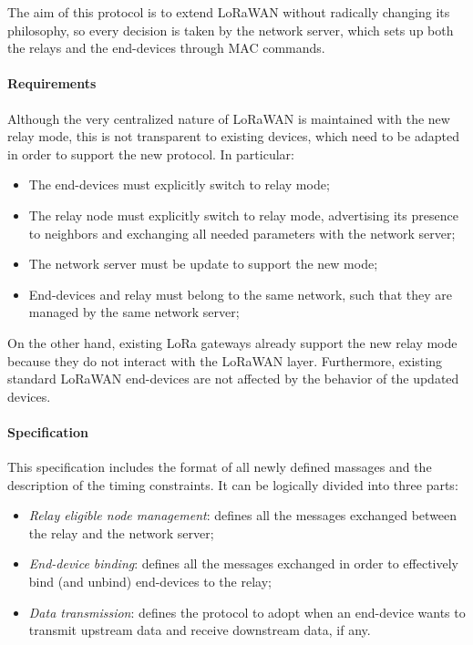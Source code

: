 The aim of this protocol is to extend LoRaWAN without radically changing its philosophy, so every decision is taken by the network server, which sets up both the relays and the end-devices through MAC commands.

\paragraph{Requirements} Although the very centralized nature of LoRaWAN is maintained with the new relay mode, this is not transparent to existing devices, which need to be adapted in order to support the new protocol. In particular:

\begin{itemize}
\item The end-devices must explicitly switch to relay mode;
\item The relay node must explicitly switch to relay mode, advertising its presence to neighbors and exchanging all needed parameters with the network server;
\item The network server must be update to support the new mode;
\item End-devices and relay must belong to the same network, such that they are managed by the same network server;
\end{itemize}

On the other hand, existing LoRa gateways already support the new relay mode because they do not interact with the LoRaWAN layer. Furthermore, existing standard LoRaWAN end-devices are not affected by the behavior of the updated devices. 



\paragraph{Specification} This specification includes the format of all newly defined massages and the description of the timing constraints. It can be logically divided into three parts:

\begin{itemize}
\item \emph{Relay eligible node management}: defines all the messages exchanged between the relay and the network server;

\item \emph{End-device binding}: defines all the messages exchanged in order to effectively bind (and unbind) end-devices to the relay;

\item \emph{Data transmission}: defines the protocol to adopt when an end-device wants to transmit upstream data and receive downstream data, if any.
\end{itemize}


